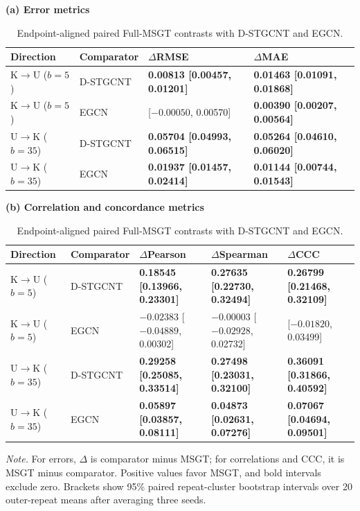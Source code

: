 \begin{table}[!t]
\centering
\footnotesize
\renewcommand{\arraystretch}{1.18}
\setlength{\tabcolsep}{3.5pt}
\caption{Endpoint-aligned paired Full-MSGT contrasts with D-STGCNT and EGCN.}
\label{tab:recent-endpoints}
\textbf{(a) Error metrics}\par\vspace{2pt}
\begin{tabularx}{\textwidth}{@{}ll>{\centering\arraybackslash}X>{\centering\arraybackslash}X@{}}
\toprule
\rowcolor{headergray}
Direction & Comparator & $\Delta$RMSE & $\Delta$MAE \\
\midrule
\rowcolor{msgthair}
K$\rightarrow$U ($b=5$) & D-STGCNT & \textbf{0.00813 [0.00457, 0.01201]} & \textbf{0.01463 [0.01091, 0.01868]} \\
K$\rightarrow$U ($b=5$) & EGCN & 0.00274 [$-0.00050$, 0.00570] & \textbf{0.00390 [0.00207, 0.00564]} \\
\addlinespace[2pt]
\rowcolor{msgthair}
U$\rightarrow$K ($b=35$) & D-STGCNT & \textbf{0.05704 [0.04993, 0.06515]} & \textbf{0.05264 [0.04610, 0.06020]} \\
U$\rightarrow$K ($b=35$) & EGCN & \textbf{0.01937 [0.01457, 0.02414]} & \textbf{0.01144 [0.00744, 0.01543]} \\
\bottomrule
\end{tabularx}

\vspace{5pt}
\textbf{(b) Correlation and concordance metrics}\par\vspace{2pt}
\begin{tabularx}{\textwidth}{@{}ll>{\centering\arraybackslash}X>{\centering\arraybackslash}X>{\centering\arraybackslash}X@{}}
\toprule
\rowcolor{headergray}
Direction & Comparator & $\Delta$Pearson & $\Delta$Spearman & $\Delta$CCC \\
\midrule
\rowcolor{msgthair}
K$\rightarrow$U ($b=5$) & D-STGCNT & \textbf{0.18545 [0.13966, 0.23301]} & \textbf{0.27635 [0.22730, 0.32494]} & \textbf{0.26799 [0.21468, 0.32109]} \\
K$\rightarrow$U ($b=5$) & EGCN & $-0.02383$ [$-0.04889$, 0.00302] & $-0.00003$ [$-0.02928$, 0.02732] & 0.00859 [$-0.01820$, 0.03499] \\
\addlinespace[2pt]
\rowcolor{msgthair}
U$\rightarrow$K ($b=35$) & D-STGCNT & \textbf{0.29258 [0.25085, 0.33514]} & \textbf{0.27498 [0.23031, 0.32100]} & \textbf{0.36091 [0.31866, 0.40592]} \\
U$\rightarrow$K ($b=35$) & EGCN & \textbf{0.05897 [0.03857, 0.08111]} & \textbf{0.04873 [0.02631, 0.07276]} & \textbf{0.07067 [0.04694, 0.09501]} \\
\bottomrule
\end{tabularx}
\vspace{4pt}
\parbox{0.96\textwidth}{\footnotesize \textit{Note.} For errors, $\Delta$ is comparator minus MSGT; for correlations and CCC, it is MSGT minus comparator. Positive values favor MSGT, and bold intervals exclude zero. Brackets show 95\% paired repeat-cluster bootstrap intervals over 20 outer-repeat means after averaging three seeds.}
\end{table}
